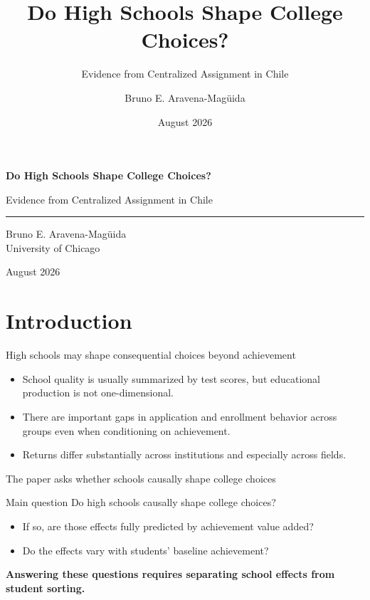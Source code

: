 \documentclass[11pt,aspectratio=169]{beamer}
\title{Do High Schools Shape College Choices?}
\subtitle{Evidence from Centralized Assignment in Chile}
\author{Bruno E. Aravena-Mag\"uida}
\institute{University of Chicago}
\date{August 2026}
\let\oldparencite\parencite
\renewcommand{\parencite}[2][]{%
  \footnotesize {\tiny \oldparencite[#1]{#2}} \normalsize%
}
\newcommand{\key}[1]{\textcolor{mDarkTeal}{\textbf{#1}}}
\newenvironment{wideitemize}{%
  \begin{minipage}{0.92\textwidth}
  \begin{itemize}
  \addtolength{\itemsep}{0.85em}
}{%
  \end{itemize}
  \end{minipage}
}
\begin{document}
\begin{frame}[plain,t]
\vspace{1.25cm}
{\LARGE\bfseries Do High Schools Shape College Choices?\par}
\vspace{0.35em}
{\large Evidence from Centralized Assignment in Chile\par}
\vspace{0.8em}
\rule{\textwidth}{0.4pt}
\vspace{0.9em}

Bruno E. Aravena-Mag\"uida\\
University of Chicago

\vspace{0.6em}
August 2026
\end{frame}

\section{Introduction}

\begin{frame}{High schools may shape consequential choices beyond achievement}
\begin{wideitemize}
  \item School quality is usually summarized by test scores, but educational production is not one-dimensional. \parencite{jackson_what_2018,beuermann_what_2023,rose_effects_2022}

  \item There are important gaps in application and enrollment behavior across groups even when conditioning on achievement. \parencite{hoxby_what_2015,dynarski_closing_2021,hastings_informed_2016,chetty_diversifying_2025}

  \item Returns differ substantially across institutions and especially across fields. \parencite{kirkeboen_field_2016}
\end{wideitemize}
\end{frame}

\begin{frame}{The paper asks whether schools causally shape college choices}
\begin{alertblock}{Main question}
Do high schools causally shape college choices?
\end{alertblock}

\begin{wideitemize}
  \item If so, are those effects fully predicted by achievement value added?
  \item Do the effects vary with students' baseline achievement?
\end{wideitemize}

\key{Answering these questions requires separating school effects from student sorting.}
\end{frame}
\end{document}
